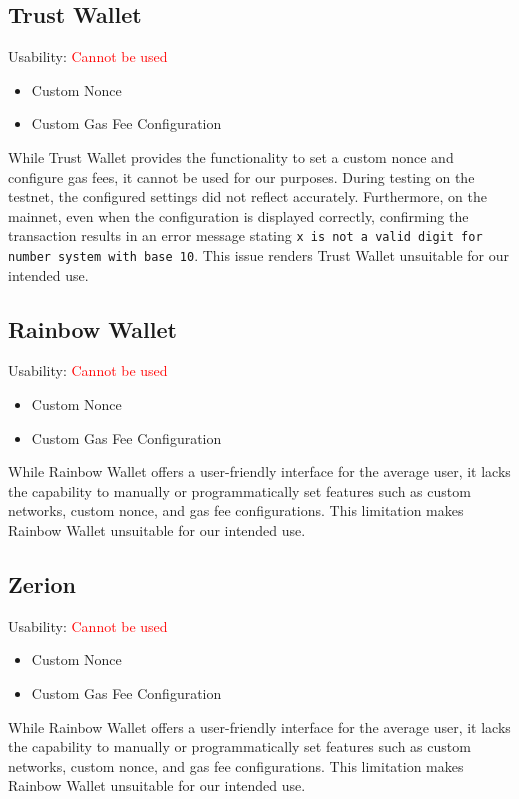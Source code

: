 \documentclass[fleqn,10pt]{olplainarticle}
\newcommand{\cmark}{\ding{51}}%
\newcommand{\xmark}{\ding{55}}%
\begin{document}
\subsection{Trust Wallet}
Usability: \textcolor{red}{Cannot be used}
\begin{itemize}[noitemsep, nolistsep]
	\item [\textcolor{green}{\cmark}] Custom Nonce
	\item [\textcolor{green}{\cmark}] Custom Gas Fee Configuration
\end{itemize}
While Trust Wallet provides the functionality to set a custom nonce and configure gas fees, it cannot be used for our purposes. During testing on the testnet, the configured settings did not reflect accurately. Furthermore, on the mainnet, even when the configuration is displayed correctly, confirming the transaction results in an error message stating \texttt{x is not a valid digit for number system with base 10}. This issue renders Trust Wallet unsuitable for our intended use.

\subsection{Rainbow Wallet}
Usability: \textcolor{red}{Cannot be used}
\begin{itemize}[noitemsep, nolistsep]
	\item [\textcolor{red}{\xmark}] Custom Nonce
	\item [\textcolor{red}{\xmark}] Custom Gas Fee Configuration
\end{itemize}
While Rainbow Wallet offers a user-friendly interface for the average user, it lacks the capability to manually or programmatically set features such as custom networks, custom nonce, and gas fee configurations. This limitation makes Rainbow Wallet unsuitable for our intended use.

\subsection{Zerion}
Usability: \textcolor{red}{Cannot be used}
\begin{itemize}[noitemsep, nolistsep]
	\item [\textcolor{red}{\xmark}] Custom Nonce
	\item [\textcolor{red}{\xmark}] Custom Gas Fee Configuration
\end{itemize}
While Rainbow Wallet offers a user-friendly interface for the average user, it lacks the capability to manually or programmatically set features such as custom networks, custom nonce, and gas fee configurations. This limitation makes Rainbow Wallet unsuitable for our intended use.
\end{document}
